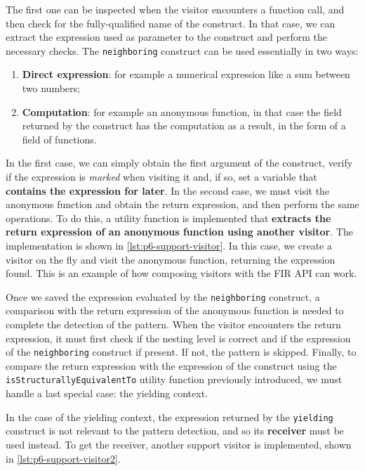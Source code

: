 \documentclass[12pt,a4paper,openright,twoside]{book}
\begin{document}
The first one can be inspected when the visitor encounters a function call, and
then check for the fully-qualified name of the construct. In that case, we can
extract the expression used as parameter to the construct and perform the
necessary checks. The \lstinline{neighboring} construct can be used essentially
in two ways:
\begin{enumerate}
  \item \textbf{Direct expression}: for example a numerical expression like a
  sum between two numbers;
  \item \textbf{Computation}: for example an anonymous function, in that case
  the field returned by the construct has the computation as a result, in the 
  form of a field of functions.
\end{enumerate}

In the first case, we can simply obtain the first argument of the construct,
verify if the expression is \emph{marked} when visiting it and, if so, set a
variable that \textbf{contains the expression for later}. In the second case, we
must visit the anonymous function and obtain the return expression, and then
perform the same operations. To do this, a utility function is implemented that
\textbf{extracts the return expression of an anonymous function using another
visitor}. The implementation is shown in \cref{lst:p6-support-visitor}. In this
case, we create a visitor on the fly and visit the anonymous function, returning
the expression found. This is an example of how composing visitors with the
\ac{FIR} API can work.



Once we saved the expression evaluated by the \lstinline{neighboring} construct,
a comparison with the return expression of the anonymous function is needed to
complete the detection of the pattern. When the visitor encounters the return
expression, it must first check if the nesting level is correct and if the
expression of the \lstinline{neighboring} construct if present. If not, the
pattern is skipped. Finally, to compare the return expression with the
expression of the construct using the \lstinline{isStructurallyEquivalentTo}
utility function previously introduced, we must handle a last special case: the
yielding context. 

In the case of the yielding context, the expression returned by the
\lstinline{yielding} construct is not relevant to the pattern detection, and so
its \textbf{receiver} must be used instead. To get the receiver, another support 
visitor is implemented, shown in \cref{lst:p6-support-visitor2}.
\end{document}
